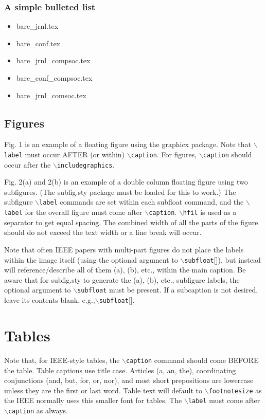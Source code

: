 \documentclass[journal]{IEEEtran}
\begin{document}
\subsubsection*{\bf A simple bulleted list}
\begin{itemize}
\item{bare\_jrnl.tex}
\item{bare\_conf.tex}
\item{bare\_jrnl\_compsoc.tex}
\item{bare\_conf\_compsoc.tex}
\item{bare\_jrnl\_comsoc.tex}
\end{itemize}





\subsection{Figures}
Fig. 1 is an example of a floating figure using the graphicx package.
 Note that $\backslash${\tt{label}} must occur AFTER (or within) $\backslash${\tt{caption}}.
 For figures, $\backslash${\tt{caption}} should occur after the $\backslash${\tt{includegraphics}}.



Fig. 2(a) and 2(b) is an example of a double column floating figure using two subfigures.
 (The subfig.sty package must be loaded for this to work.)
 The subfigure $\backslash${\tt{label}} commands are set within each subfloat command,
 and the $\backslash${\tt{label}} for the overall figure must come after $\backslash${\tt{caption}}.
 $\backslash${\tt{hfil}} is used as a separator to get equal spacing.
 The combined width of all the parts of the figure should do not exceed the text width or a line break will occur.
%

Note that often IEEE papers with multi-part figures do not place the labels within the image itself (using the optional argument to $\backslash${\tt{subfloat}}[]), but instead will
 reference/describe all of them (a), (b), etc., within the main caption.
 Be aware that for subfig.sty to generate the (a), (b), etc., subfigure
 labels, the optional argument to $\backslash${\tt{subfloat}} must be present. If a
 subcaption is not desired, leave its contents blank,
 e.g.,$\backslash${\tt{subfloat}}[].


 

\section{Tables}
Note that, for IEEE-style tables, the
 $\backslash${\tt{caption}} command should come BEFORE the table. Table captions use title case. Articles (a, an, the), coordinating conjunctions (and, but, for, or, nor), and most short prepositions are lowercase unless they are the first or last word. Table text will default to $\backslash${\tt{footnotesize}} as
 the IEEE normally uses this smaller font for tables.
 The $\backslash${\tt{label}} must come after $\backslash${\tt{caption}} as always.
 
\end{document}
